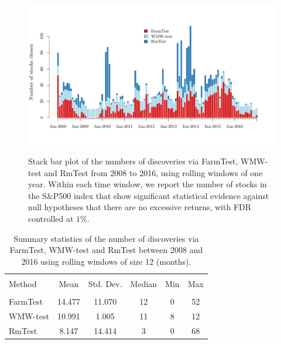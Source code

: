 


\begin{figure}[!t]
\centering
\includegraphics[width=.7\textwidth]{figures/Fig_real_2.pdf}\\
\caption {Stack bar plot of the numbers of discoveries via {FarmTest}, WMW-test and RmTest from 2008 to 2016, using rolling windows of one year. Within each time window, we report the number of stocks in the S\&P500 index that show significant statistical evidence against null hypotheses that there are no excessive returns,  with FDR controlled at $1\%.$}
\label{fig:stocks}
\end{figure}


\begin{table}[tbh]\centering
{\begin{tabular}{l|ccccc}
\hline \vspace{-0.25cm} \\
  Method&Mean & Std. Dev.&Median &Min &Max \vspace{0.1cm} \\
 \hline  \vspace{-0.3cm}  \\
\color{blue}FarmTest &\color{blue}14.477 &\color{blue}11.070 &\color{blue}12 &\color{blue}0&\color{blue}52\\
WMW-test &10.991 &1.005&11&8&12\\
RmTest&8.147 & 14.414&3&0&68\\\hline
\end{tabular}
\caption{Summary statistics of the number of discoveries via {FarmTest}, WMW-test and RmTest between 2008 and 2016 using rolling windows of size 12 (months).}
\label{tab:stocks}}
\end{table}





